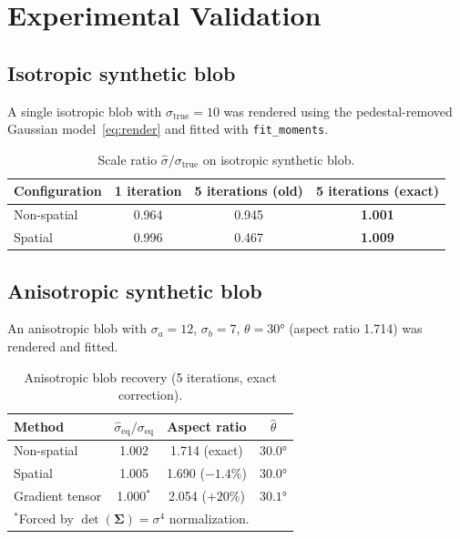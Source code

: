 \documentclass[11pt]{article}
\newcommand{\mat}[1]{\mathbf{#1}}
\begin{document}
\section{Experimental Validation}

\subsection{Isotropic synthetic blob}

A single isotropic blob with $\sigma_\text{true} = 10$ was rendered using the
pedestal-removed Gaussian model~\eqref{eq:render} and fitted with
\texttt{fit\_moments}.

\begin{table}[h]
\centering
\caption{Scale ratio $\hat\sigma/\sigma_\text{true}$ on isotropic synthetic blob.}
\label{tab:isotropic}
\begin{tabular}{@{}lccc@{}}
\toprule
Configuration & 1 iteration & 5 iterations (old) & 5 iterations (exact) \\
\midrule
Non-spatial & 0.964 & 0.945 & \textbf{1.001} \\
Spatial     & 0.996 & 0.467 & \textbf{1.009} \\
\bottomrule
\end{tabular}
\end{table}

\subsection{Anisotropic synthetic blob}

An anisotropic blob with $\sigma_a = 12$, $\sigma_b = 7$, $\theta = 30°$
(aspect ratio 1.714) was rendered and fitted.

\begin{table}[h]
\centering
\caption{Anisotropic blob recovery (5 iterations, exact correction).}
\label{tab:aniso}
\begin{tabular}{@{}lccc@{}}
\toprule
Method & $\hat\sigma_\text{eq}/\sigma_\text{eq}$ & Aspect ratio & $\hat\theta$ \\
\midrule
Non-spatial & 1.002 & 1.714 (exact) & $30.0°$ \\
Spatial     & 1.005 & 1.690 ($-1.4\%$) & $30.0°$ \\
Gradient tensor & 1.000$^*$ & 2.054 ($+20\%$) & $30.1°$ \\
\bottomrule
\multicolumn{4}{l}{\footnotesize $^*$Forced by $\det(\mat{\Sigma})=\sigma^4$ normalization.}
\end{tabular}
\end{table}
\end{document}
